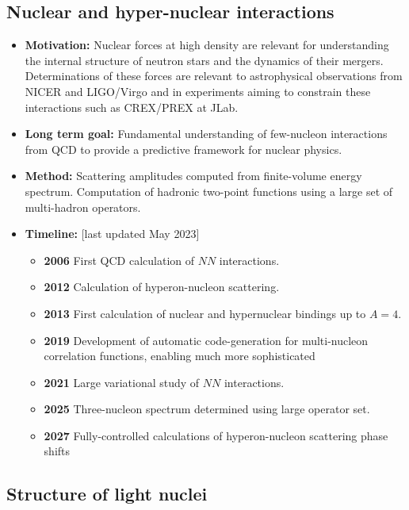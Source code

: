\documentclass[12pt,hyperpdf]{article}
\begin{document}
\subsection{Nuclear and hyper-nuclear interactions}

\begin{itemize}
    \item{\bf Motivation:} Nuclear forces at high density are relevant for understanding  the internal structure  of neutron stars and the dynamics of their mergers. Determinations of these forces are relevant to astrophysical observations from NICER and LIGO/Virgo and in experiments aiming to constrain  these interactions such as CREX/PREX at JLab.
   
    \item{\bf Long term goal:} Fundamental understanding of few-nucleon interactions from QCD to provide a predictive framework for nuclear physics. 
    
    \item{\bf Method:} Scattering
      amplitudes computed from finite-volume energy spectrum. Computation of hadronic two-point functions
      using a large set of multi-hadron operators.
      
\item{\bf Timeline:} \hfill [last updated May 2023]
\begin{itemize}
   \item{\bf 2006} First QCD calculation of $NN$ interactions.
    \item{\bf 2012} Calculation of hyperon-nucleon scattering.
    \item{\bf 2013} First calculation of nuclear and hypernuclear bindings up to $A=4$.
    \item{\bf 2019} Development of automatic code-generation for multi-nucleon correlation functions, enabling much more sophisticated 
    \item{\bf 2021} Large variational study of $NN$ interactions.
    \item{\bf 2025} Three-nucleon spectrum determined using large operator set.
    \item{\bf 2027} Fully-controlled calculations of hyperon-nucleon scattering phase shifts
    
\end{itemize}
\end{itemize}


\subsection{Structure of light nuclei}
\end{document}
